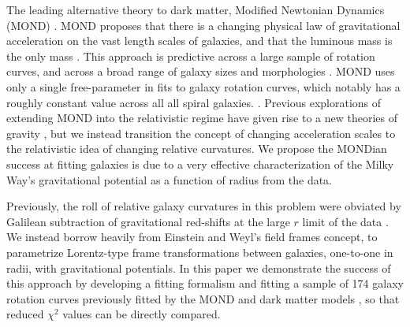 \documentclass[reprint,%
 amsmath,amssymb,
 aps,
]{revtex4-1}
\begin{document}
      
 
  
    
  The leading   alternative theory  to dark matter,  Modified Newtonian Dynamics (MOND) \cite{Milgrom}. MOND proposes    
  that there is  a changing  physical law of gravitational acceleration   on the vast length scales of galaxies, and that the   luminous mass is the only mass
  \cite{McGaugh_2014}. 
  This approach  is   predictive across a large sample of  rotation curves, and   across a broad   range  of galaxy sizes and morphologies \cite{2016Lelli}. MOND uses only   a single free-parameter in fits to  galaxy rotation curves, which notably  has   a roughly constant value across all all spiral   galaxies.  \cite{McGaugh2016RAR,2022A&A...664A..40M}. 
  Previous explorations of  extending MOND into the relativistic regime have given rise to a new theories of gravity  \cite{PhysRevD.70.083509,doi:10.1142/S0217751X0703666X}, but we instead transition the concept of  changing acceleration scales to   the relativistic idea of  changing relative curvatures.   
  We propose  the     MONDian success at fitting galaxies  is due to a very effective characterization
  of the Milky Way's gravitational potential as a function of radius  from the data. 
   
 
 
 
 


     Previously, the roll of 
   relative galaxy curvatures  in this problem  were    obviated 
       by  Galilean subtraction of   gravitational red-shifts at the  large $r$  limit of the data \citep{MTW}. 
       We   
      instead   borrow heavily from Einstein and Weyl's field frames concept, to parametrize   Lorentz-type frame transformations     between galaxies, one-to-one in radii,   with gravitational potentials. 
      In this paper we demonstrate the success of this approach by developing a fitting formalism and fitting   a sample of 174 galaxy rotation curves previously fitted by the MOND and dark matter models  \cite{McGaugh2016RAR,2016Lelli}, so that reduced $\chi^2$ values can be directly compared.  
      
\end{document}
